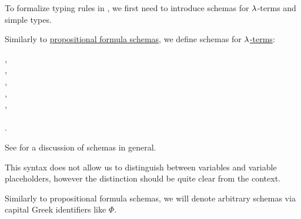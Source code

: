 To formalize typing rules in , we first need to introduce schemas for \( \synlambda \)-terms and simple types.

\begin{definition}\label{def:lambda_term_schema}
  Similarly to \hyperref[def:propositional_formula_schema]{propositional formula schemas}, we define schemas for \hyperref[def:lambda_term]{\( \synlambda \)-terms}:
  \begin{bnf*}
     {}, \\
         {}, \\
              { \bnfor {}}, \\
       {\bnftsq{\( ( \)} \bnfsp {} \bnfsp {} \bnfsp \bnftsq{\( ) \)}}, \\
       {\bnftsq{\( ( \)} \bnfsp \bnftsq{\( \synlambda \)} \bnfsp {} \bnfsp {} \bnfsp {} \bnfsp \bnftsq{\( ) \)}}, \\
              { \bnfor {} \bnfor} \\
    .
  \end{bnf*}
\end{definition}
\begin{comments}
  \item See  for a discussion of schemas in general.

  \item This syntax does not allow us to distinguish between variables and variable placeholders, however the distinction should be quite clear from the context.

  \item Similarly to propositional formula schemas, we will denote arbitrary schemas via capital Greek identifiers like \( \Phi \).
\end{comments}


